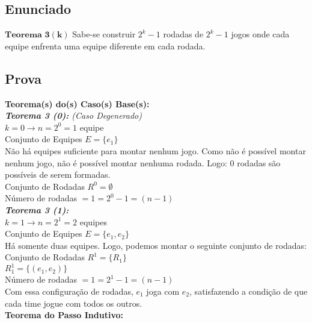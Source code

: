 \documentclass[twoside]{article}
\begin{document}
\begin{multicols}{2}
\subsection{ Enunciado }
\indent $\mathbf{Teorema}$ $\mathbf{3}$$\mathbf{(k)}$ Sabe-se construir $2^k - 1$ rodadas de $2^k - 1$ jogos onde cada equipe enfrenta uma equipe diferente em cada rodada.\\

\subsection{ Prova }
\indent 

\textbf{Teorema(s) do(s) Caso(s) Base(s):}\\

\textit{\textbf{Teorema 3 (0):} (Caso Degenerado)}\\
$ k=0 \rightarrow n=2^0=1$ equipe\\
Conjunto de Equipes $E = \{e_1\}$\\
Não há equipes suficiente para montar nenhum jogo. Como não é possível montar nenhum jogo, não é possível montar nenhuma rodada. Logo: 0 rodadas são possíveis de serem formadas.\\
Conjunto de Rodadas $R^0 = \emptyset$\\
Número de rodadas $= 1 = 2^0-1 = (n-1)$\\

\textit{\textbf{Teorema 3 (1):}}\\
$ k=1 \rightarrow n=2^1=2$ equipes\\
Conjunto de Equipes $E = \{e_1,e_2\}$\\
Há somente duas equipes. Logo, podemos montar o seguinte conjunto de rodadas:\\
Conjunto de Rodadas $R^1 = \{R_1\}$\\
 $R^1_1 =\{(e_1,e_2)\}$\\
Número de rodadas $= 1 = 2^1-1 = (n-1)$\\
Com essa configuração de rodadas, $e_1$ joga com $e_2$, satisfazendo a condição de que cada time jogue com todos os outros.\\

\textbf{Teorema do Passo Indutivo:}\\


\end{multicols}
\end{document}
